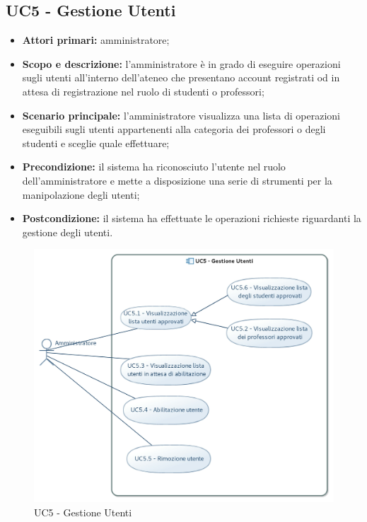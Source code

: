 \documentclass[AnalisiDeiRequisiti.tex]{subfiles}
\begin{document}
\subsection{UC5 - Gestione Utenti}
\begin{itemize}
	\item \textbf{Attori primari:} amministratore;
	\item \textbf{Scopo e descrizione:} l'amministratore è in grado di eseguire operazioni sugli utenti all'interno dell'ateneo che presentano account registrati od in attesa di registrazione nel ruolo di studenti o professori;
	\item \textbf{Scenario principale:} l'amministratore visualizza una lista di operazioni eseguibili sugli utenti appartenenti alla categoria dei professori o degli studenti e sceglie quale effettuare;
	\item \textbf{Precondizione:} il sistema ha riconosciuto l'utente nel ruolo dell'amministratore e mette a disposizione una serie di strumenti per la manipolazione degli utenti; 
	\item \textbf{Postcondizione:} il sistema ha effettuate le operazioni richieste riguardanti la gestione degli utenti.
\end{itemize}

\begin{figure}[H]
	\centering
	\includegraphics[width=0.8\linewidth]{UC5.jpg}
	\caption{UC5 - Gestione Utenti}
	\label{fig:UC5 - Gestione Utenti}
\end{figure}

\end{document}
